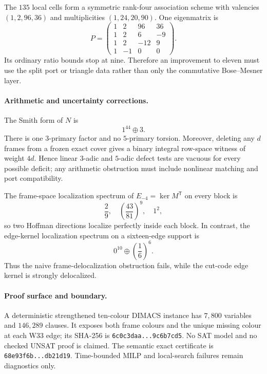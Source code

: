 The $135$ local cells form a symmetric rank-four association scheme with
valencies $(1,2,96,36)$ and multiplicities $(1,24,20,90)$.  One eigenmatrix is
\[
P=\begin{pmatrix}
1&2&96&36\\
1&2&6&-9\\
1&2&-12&9\\
1&-1&0&0
\end{pmatrix}.
\]
Its ordinary ratio bounds stop at nine.  Therefore an improvement to eleven
must use the split port or triangle data rather than only the commutative
Bose--Mesner layer.

\paragraph{Arithmetic and uncertainty corrections.}
The Smith form of $N$ is
\[
\boxed{1^{44}\oplus3}.
\]
There is one $3$-primary factor and no $5$-primary torsion.  Moreover, deleting
any $d$ frames from a frozen exact cover gives a binary integral row-space
witness of weight $4d$.  Hence linear $3$-adic and $5$-adic defect tests are
vacuous for every possible deficit; any arithmetic obstruction must include
nonlinear matching and port compatibility.

The frame-space localization spectrum of $E_{-4}=\ker M^{\mathsf T}$ on every
block is
\[
\frac29,\quad\left(\frac{43}{81}\right)^9,\quad1^2,
\]
so two Hoffman directions localize perfectly inside each block.  In contrast,
the edge-kernel localization spectrum on a sixteen-edge support is
\[
0^{10}\oplus\left(\frac16\right)^6.
\]
Thus the naive frame-delocalization obstruction fails, while the cut-code edge
kernel is strongly delocalized.

\paragraph{Proof surface and boundary.}
A deterministic strengthened ten-colour DIMACS instance has $7{,}800$
variables and $146{,}289$ clauses.  It exposes both frame colours and the
unique missing colour at each W33 edge; its SHA-256 is
\texttt{6c0c3daa...9c6b7cd5}.  No SAT model and no checked UNSAT proof is claimed.
The semantic exact certificate is
\texttt{68e93f6b...db21d19}.  Time-bounded MILP and local-search failures remain
diagnostics only.
